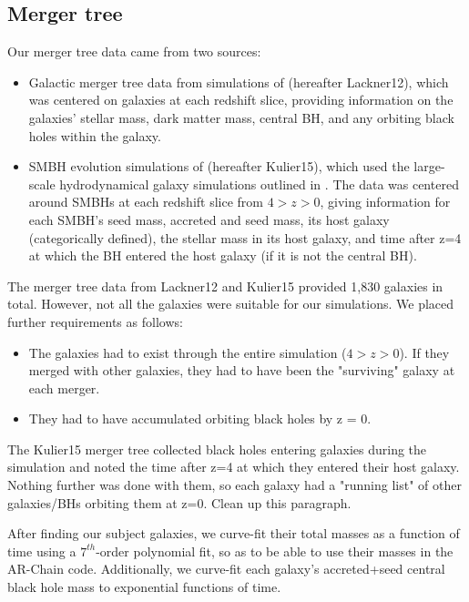 \documentclass[english, apj]{emulateapj}
\begin{document}
\subsection{Merger tree}
Our merger tree data came from two sources:
\begin{itemize}
\item Galactic merger tree data from simulations of \citet{2012MNRAS.425..641L} (hereafter Lackner12), which was centered on galaxies at each redshift slice, providing information on the galaxies' stellar mass, dark matter mass, central BH, and any orbiting black holes within the galaxy.
\item SMBH evolution simulations of \citet{2015ApJ...799..178K} (hereafter Kulier15), which used the large-scale hydrodynamical galaxy simulations outlined in \citet{2011ApJ...741...99C, 2011ApJ...742L..33C, 2012ApJ...753...17C, 2012ApJ...748..121C, 2013ApJ...770..139C}.  The data was centered around SMBHs at each redshift slice from $4 > z > 0$, giving information for each SMBH's seed mass, accreted and seed mass, its host galaxy (categorically defined), the stellar mass in its host galaxy, and time after z=4 at which the BH entered the host galaxy (if it is not the central BH).
\end{itemize}

The merger tree data from Lackner12 and Kulier15 provided 1,830 galaxies in total.  However, not all the galaxies were suitable for our simulations.  We placed further requirements as follows:
\begin{itemize}
\item The galaxies had to exist through the entire simulation ($4 > z > 0$).  If they merged with other galaxies, they had to have been the "surviving" galaxy at each merger.
\item They had to have accumulated orbiting black holes by z = 0.
\end{itemize}

The Kulier15 merger tree collected black holes entering galaxies during the simulation and noted the time after z=4 at which they entered their host galaxy.  Nothing further was done with them, so each galaxy had a "running list" of other galaxies/BHs orbiting them at z=0.  Clean up this paragraph.

After finding our subject galaxies, we curve-fit their total masses as a function of time using a $7^{th}$-order polynomial fit, so as to be able to use their masses in the AR-Chain code.  Additionally, we curve-fit each galaxy's accreted+seed central black hole mass to exponential functions of time.
\end{document}
